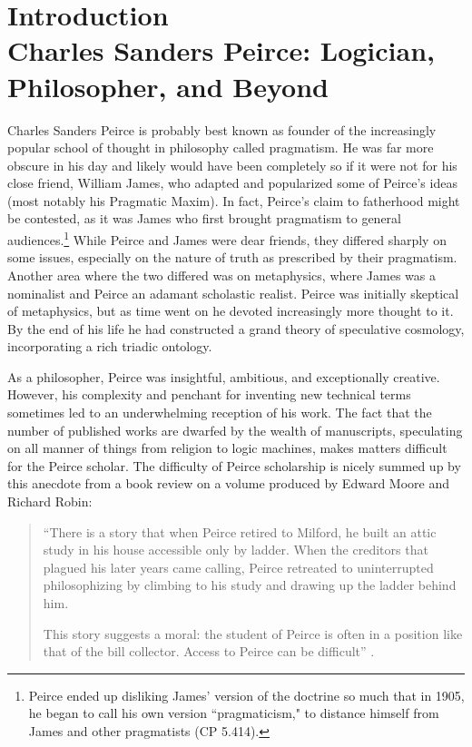 \chapter{Introduction \\ \small{Charles Sanders Peirce: Logician, Philosopher, and Beyond}}
Charles Sanders Peirce is probably best known as founder of the increasingly popular school of thought in philosophy  called pragmatism. He was far more obscure in his day and likely would have been completely so if it were not for his close friend, William James, who adapted and popularized some of Peirce's ideas (most notably his Pragmatic Maxim). In fact, Peirce's claim to fatherhood might be contested, as it was James who first brought pragmatism to general audiences.\footnote{Peirce ended up disliking James' version of the doctrine so much that in 1905, he began to call his own version ``pragmaticism," to distance himself from James and other pragmatists (CP 5.414).} While Peirce and James were dear friends, they differed sharply on some issues, especially on the nature of truth as prescribed by their pragmatism. Another area where the two differed was on metaphysics, where James was a nominalist and Peirce an adamant scholastic realist. Peirce was initially skeptical of metaphysics, but as time went on he devoted increasingly more thought to it. By the end of his life he had constructed a grand theory of speculative cosmology, incorporating a rich triadic ontology.

As a philosopher, Peirce was insightful, ambitious, and exceptionally creative. However, his complexity and penchant for inventing new technical terms sometimes led to an underwhelming reception of his work. The fact that the number of published works are dwarfed by the wealth of manuscripts, speculating on all manner of things from religion to logic machines, makes matters difficult for the Peirce scholar. The difficulty of Peirce scholarship is nicely summed up by this anecdote from a book review on a volume produced by Edward Moore and Richard Robin:\begin{quote} \noindent``There is a story that when Peirce retired to Milford, he built an attic study in his house accessible only by ladder. When the creditors that plagued his later years came calling, Peirce retreated to uninterrupted philosophizing by climbing to his study and drawing up the ladder behind him.

This story suggests a moral: the student of Peirce is often in a position like that of the bill collector. Access to Peirce can be difficult'' \citep[73]{thayer_book_1967}.\end{quote}

